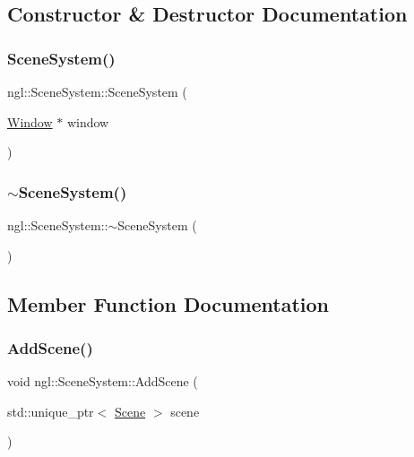 \subsection{Constructor \& Destructor Documentation}
\mbox{\label{classngl_1_1_scene_system_a95860dbe4267edf52fa59c8606e9b35c}} 
\subsubsection{\texorpdfstring{Scene\+System()}{SceneSystem()}}
{\footnotesize\ttfamily ngl\+::\+Scene\+System\+::\+Scene\+System (\begin{DoxyParamCaption}\item[{\mbox{\hyperlink{classngl_1_1_window}{Window}} $\ast$}]{window }\end{DoxyParamCaption})\hspace{0.3cm}{\ttfamily [explicit]}}

\mbox{\label{classngl_1_1_scene_system_a6310af7c9c8223995b5bf2c771f459e4}} 
\subsubsection{\texorpdfstring{$\sim$\+Scene\+System()}{~SceneSystem()}}
{\footnotesize\ttfamily ngl\+::\+Scene\+System\+::$\sim$\+Scene\+System (\begin{DoxyParamCaption}{ }\end{DoxyParamCaption})}



\subsection{Member Function Documentation}
\mbox{\label{classngl_1_1_scene_system_ae3b08ac9812fdc43af044e6b8831688d}} 
\subsubsection{\texorpdfstring{Add\+Scene()}{AddScene()}}
{\footnotesize\ttfamily void ngl\+::\+Scene\+System\+::\+Add\+Scene (\begin{DoxyParamCaption}\item[{std\+::unique\+\_\+ptr$<$ \mbox{\hyperlink{classngl_1_1_scene}{Scene}} $>$}]{scene }\end{DoxyParamCaption})}


